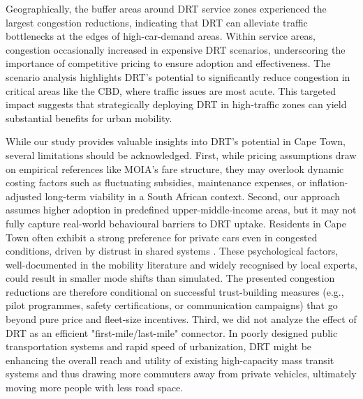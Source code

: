 \documentclass[main.tex]{subfiles}
\begin{document}
Geographically, the buffer areas around DRT service zones experienced the largest congestion reductions, indicating that DRT can alleviate traffic bottlenecks at the edges of high-car-demand areas. Within service areas, congestion occasionally increased in expensive DRT scenarios, underscoring the importance of competitive pricing to ensure adoption and effectiveness. The scenario analysis highlights DRT’s potential to significantly reduce congestion in critical areas like the CBD, where traffic issues are most acute. This targeted impact suggests that strategically deploying DRT in high-traffic zones can yield substantial benefits for urban mobility.

While our study provides valuable insights into DRT's potential in Cape Town, several limitations should be acknowledged. First, while pricing assumptions draw on empirical references like MOIA's fare structure, they may overlook dynamic costing factors such as fluctuating subsidies, maintenance expenses, or inflation-adjusted long-term viability in a South African context. Second, our approach assumes higher adoption in predefined upper-middle-income areas, but it may not fully capture real-world behavioural barriers to DRT uptake. Residents in Cape Town often exhibit a strong preference for private cars even in congested conditions, driven by distrust in shared systems \citep{Konig2018-pe}. These psychological factors, well-documented in the mobility literature and widely recognised by local experts, could result in smaller mode shifts than simulated. The presented congestion reductions are therefore conditional on successful trust-building measures (e.g., pilot programmes, safety certifications, or communication campaigns) that go beyond pure price and fleet-size incentives. Third, we did not analyze the effect of DRT as an efficient "first-mile/last-mile" connector. In poorly designed public transportation systems and rapid speed of urbanization, DRT might be enhancing the overall reach and utility of existing high-capacity mass transit systems and thus drawing more commuters away from private vehicles, ultimately moving more people with less road space.
\end{document}
